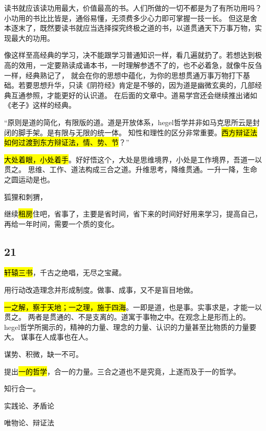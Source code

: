 \begin{shadequote}
读书就应该读功用最大，价值最高的书。人们所做的一切不都是为了有所功用吗？小功用的书比比皆是，通俗易懂，无须费多少心力即可掌握一技一长。
但这是舍本逐末了，既然要读书就应当选择探究终极之道的书，以道贯通天下万事万物，实现最大的功用。

像这样至高经典的学习，决不能跟学习普通知识一样，看几遍就扔了。若想达到极高的效用，一定要熟读成诵本书，一时理解参透不了的，也不必着急，就像牛反刍一样，经典熟记了，
就会在你的思想中蕴化，为你的思想贯通万事万物打下基础。若要思想升华，只读《阴符经》肯定是不够的，因为道是幽微玄奥的，几部经典互通参照，才能更好的认识道。
在后面的文章中。道易学宫还会继续推出诸如《老子》这样的经典。
\end{shadequote}


\enquote{原则是道的简化，有限版的道。道是开放体系，hegel哲学并非如马克思所云是封闭的脚手架。是有限与无限的统一体。
知性和理性的区分非常重要。\hl{西方辩证法如何过渡到东方辩证法，情、势、节}？}

\hrulefill

\hl{大处着眼，小处着手}。好好悟这个，大处是思维境界，小处是工作境界，吾道一以贯之。
思维、工作、道法构成三合之道。升维思考，降维贯通。一升一降，生命之圆运动是也。

狐狸和刺猬，

继续\hl{租房}住吧，省事了，主要是省时间，省下来的时间好好用来学习，提高自己，再给一年时间，需要一个质的变化。

\subsection{21}

\hl{轩辕三书}，千古之绝唱，无尽之宝藏。

用行动改造理念并形成制度。做事、成事，又不是盲目地做。

\hl{一之解，察于天地；一之理，施于四海}。一即是道，也是事。实事求是，才能一以贯之。
两者是贯通的、不是支离的。道寓于事物之中。在观念上是形而上的。
hegel哲学所揭示的，精神的力量、理念的力量、认识的力量甚至比物质的力量要大。
谋事在人成事也在人。

谋势、积微，缺一不可。

提出\hl{一的哲学}，合一的力量。三合之道也不是究竟，上遂而及于一的哲学。

知行合一。

实践论、矛盾论

唯物论、辩证法
